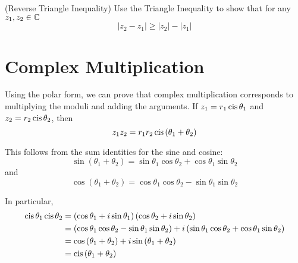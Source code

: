 \documentclass[handout]{ximera}
\begin{document}
\begin{image}
\end{image}

\begin{problem}(Reverse Triangle Inequality)
Use the Triangle Inequality to show that for any $z_1, z_2 \in \mathbb C$
\[
|z_2 -z_1| \geq |z_2| - |z_1|
\]
\end{problem}

\section{Complex Multiplication}

Using the polar form, we can prove that complex multiplication corresponds to
multiplying the moduli and adding the arguments.
If $z_1 = r_1 \operatorname{cis} \theta_1$ and $z_2 = r_2 \operatorname{cis} \theta_2$, then
\[
 z_1 z_2 = r_1 r_2\operatorname{cis} \left(\theta_1+\theta_2\right) 
 \]

This follows from the sum identities for the sine and cosine:
\[
\sin\left(\theta_1+\theta_2\right) = \sin\theta_1 \cos \theta_2 +  \cos \theta_1 \sin \theta_2
\]
and
\[
\cos\left(\theta_1+\theta_2\right) = \cos\theta_1 \cos \theta_2 -  \sin \theta_1 \sin \theta_2
\]

In particular,
\begin{align*}
\operatorname{cis} \theta_1 \operatorname{cis} \theta_2 & = \left( \cos\theta_1 +i\sin \theta_1 \right)  \left( \cos \theta_2 + i  \sin \theta_2 \right)\\
  &=  \left(\cos\theta_1 \cos \theta_2  - \sin\theta_1 \sin \theta_2\right)+i \left(\sin \theta_1\cos \theta_2 + \cos \theta_1 \sin \theta_2 \right)\\
 &= \cos\left(\theta_1+\theta_2\right) + i \sin \left(\theta_1+\theta_2\right) \\
 &= \operatorname{cis} \left(\theta_1+\theta_2\right) 
\end{align*}
\end{document}
